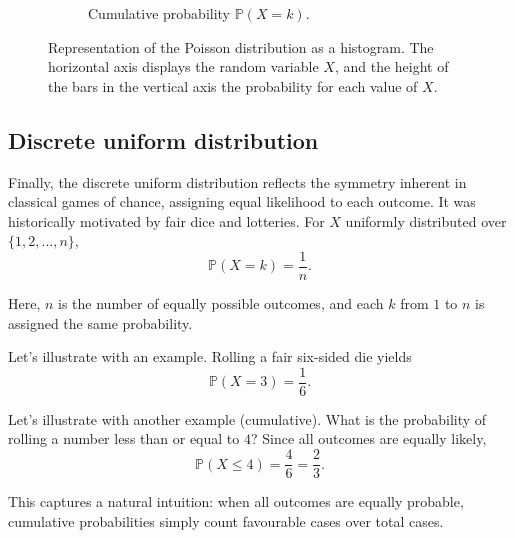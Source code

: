 \documentclass{book}
\begin{document}
\begin{figure}[ht]
\begin{subfigure}[b]{0.48\textwidth}
        \caption{Cumulative probability $\mathbb{P} (X = k)$.}
        \label{fig:poisson1_cum}
    \end{subfigure}
    \caption{Representation of the Poisson distribution as a histogram. The horizontal axis displays the random variable $X$, and the height of the bars in the vertical axis the probability for each value of $X$.}
    \label{fig:poisson_comparison}
\end{figure}

\subsection*{Discrete uniform distribution}

Finally, the discrete uniform distribution reflects the symmetry inherent in classical games of chance, assigning equal likelihood to each outcome. It was historically motivated by fair dice and lotteries. For $X$ uniformly distributed over $\{1,2,\ldots,n\}$,
\begin{equation}
	\mathbb{P}(X = k) = \frac{1}{n}.
	\label{eq:discrete_uniform}
\end{equation}

Here, $n$ is the number of equally possible outcomes, and each $k$ from $1$ to $n$ is assigned the same probability.

\medskip

Let's illustrate with an example. Rolling a fair six-sided die yields
\begin{equation}
	\mathbb{P}(X=3) = \frac{1}{6}.
\end{equation}

\medskip

Let's illustrate with another example (cumulative). What is the probability of rolling a number less than or equal to $4$? Since all outcomes are equally likely,
\begin{equation}
	\mathbb{P}(X \leq 4) = \frac{4}{6} = \frac{2}{3}.
\end{equation}

This captures a natural intuition: when all outcomes are equally probable, cumulative probabilities simply count favourable cases over total cases.
\end{document}

